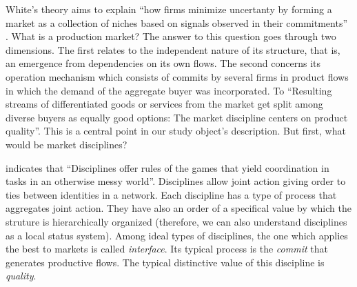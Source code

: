 \documentclass[a4paper, 12pt, openright, oneside, german, french, brazil, english, article]{abntex2}
\begin{document}
	White's theory aims to explain ``how firms minimize uncertanty by forming a market as a collection of niches based on signals observed in their commitments'' \cite[p. xiii]{white2002markets}. What is a production market? The answer to this question goes through two dimensions. The first relates to the independent nature of its structure, that is, an emergence from dependencies on its own flows. The second concerns its operation mechanism which consists of commits by several firms in product flows in which the demand of the aggregate buyer was incorporated. To  ``Resulting streams of differentiated goods or services from the market get split among diverse buyers as equally good options: The market discipline centers on product quality''. This is a central point in our study object's description. But first, what would be market disciplines?
	
	
	 indicates that ``Disciplines offer rules of the games that yield coordination in tasks in an otherwise messy world''. Disciplines allow joint action giving order to ties between identities in a network. Each discipline has a type of process that aggregates joint action. They have also an order of a specifical value by which the struture is hierarchically organized (therefore, we can also understand disciplines as a local status system). Among ideal types of disciplines, the one which applies the best to markets is called \textit{interface}. Its typical process is the \textit{commit} that generates productive flows. The typical distinctive value of this discipline is \textit{quality}.
	
\end{document}
